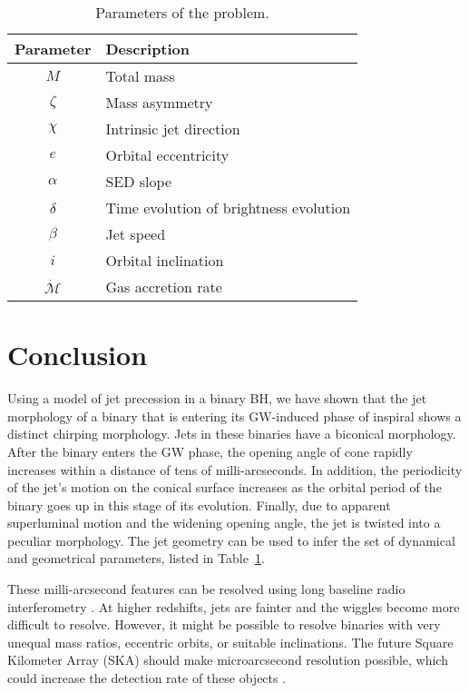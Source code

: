 \documentclass[a4paper,fleqn,usenatbib]{mnras}
\begin{document}
\begin{table}
\begin{center}
\begin{tabular}{c l}
\hline 
Parameter & Description \\ 
\hline 
$M$ & Total mass \\
$\zeta$ & Mass asymmetry \\
$\chi$ & Intrinsic jet direction \\
$e$ & Orbital eccentricity \\
$\alpha$ & SED slope \\
$\delta$ & Time evolution of brightness evolution \\
$\beta$ & Jet speed \\
$i$ & Orbital inclination \\ 
$\dot{\mathcal M}$ & Gas accretion rate\\
\hline
\end{tabular}
\end{center}
\caption{Parameters of the problem.}
\label{table:params}
\end{table}

\section{Conclusion}

Using a model of jet precession in a binary BH, we have shown that the
jet morphology of a binary that is entering its GW-induced phase of
inspiral shows a distinct chirping morphology. Jets in these binaries
have a biconical morphology.  After the binary enters the GW phase,
the opening angle of cone rapidly increases within a distance of tens
of milli-arcseconds.  In addition, the periodicity of the jet's motion
on the conical surface increases as the orbital period of the binary
goes up in this stage of its evolution.  Finally, due to apparent
superluminal motion and the widening opening angle, the jet is twisted
into a peculiar morphology.  The jet geometry can be used to infer the
set of dynamical and geometrical parameters, listed in
Table~\ref{table:params}.

These milli-arcsecond features can be resolved using long baseline
radio interferometry \citep{2001ChJAA...1..236Q}.  At higher
redshifts, jets are fainter and the wiggles become more difficult to
resolve.  However, it might be possible to resolve binaries with very
unequal mass ratios, eccentric orbits, or suitable inclinations.  The
future Square Kilometer Array (SKA) should make microarcsecond
resolution possible, which could increase the detection rate of these
objects \citep{2014arXiv1412.5971P}.
\end{document}
